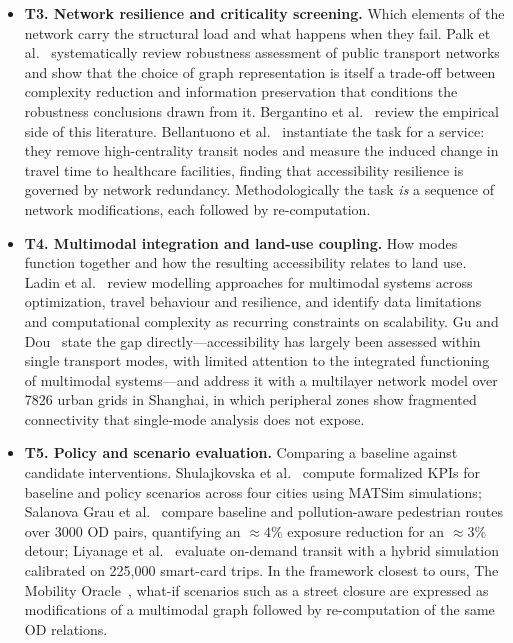 \documentclass[smartcities,article,submit,moreauthors]{Definitions/mdpi}
\begin{document}
\begin{itemize}
        \item \textbf{T3. Network resilience and criticality screening.}
        Which elements of the network carry the structural load and what happens when they fail.
        Palk et al.~\cite{palk2026robustness} systematically review robustness assessment of public
        transport networks and show that the choice of graph representation is itself a trade-off
        between complexity reduction and information preservation that conditions the robustness
        conclusions drawn from it. Bergantino et al.~\cite{bergantino2024resilience} review the
        empirical side of this literature. Bellantuono et al.~\cite{bellantuono2025rome} instantiate
        the task for a service: they remove high-centrality transit nodes and measure the induced
        change in travel time to healthcare facilities, finding that accessibility resilience is
        governed by network redundancy. Methodologically the task \emph{is} a sequence of network
        modifications, each followed by re-computation.

        \item \textbf{T4. Multimodal integration and land-use coupling.}
        How modes function together and how the resulting accessibility relates to land use. Ladin et
        al.~\cite{ladin2025review} review modelling approaches for multimodal systems across
        optimization, travel behaviour and resilience, and identify data limitations and
        computational complexity as recurring constraints on scalability. Gu and
        Dou~\cite{gu2026multilayer} state the gap directly---accessibility has largely been assessed
        within single transport modes, with limited attention to the integrated functioning of
        multimodal systems---and address it with a multilayer network model over 7826 urban grids in
        Shanghai, in which peripheral zones show fragmented connectivity that single-mode analysis
        does not expose.

        \item \textbf{T5. Policy and scenario evaluation.}
        Comparing a baseline against candidate interventions. Shulajkovska et
        al.~\cite{shulajkovska2024framework} compute formalized KPIs for baseline and policy scenarios
        across four cities using MATSim simulations; Salanova Grau et
        al.~\cite{salanovagrau2026pollution} compare baseline and pollution-aware pedestrian routes
        over 3000 OD pairs, quantifying an ${\approx}4\%$ exposure reduction for an ${\approx}3\%$
        detour; Liyanage et al.~\cite{liyanage2025ondemand} evaluate on-demand transit with a hybrid
        simulation calibrated on 225,000 smart-card trips. In the framework closest to ours, The
        Mobility Oracle~\cite{gogousou2026mobilityoracle}, what-if scenarios such as a street closure
        are expressed as modifications of a multimodal graph followed by re-computation of the same OD
        relations.
    \end{itemize}
\end{document}
